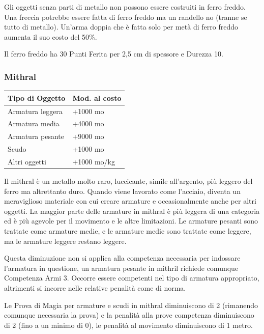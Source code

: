 \begin{multicols}{2}
Gli oggetti senza parti di metallo non possono essere costruiti in ferro freddo. Una freccia potrebbe essere fatta di ferro freddo ma un randello no (tranne se tutto di metallo). Un'arma doppia che è fatta solo per metà di ferro freddo aumenta il suo costo del 50\%.

Il ferro freddo ha 30 Punti Ferita per 2,5 cm di spessore e Durezza 10.

\subsubsection{Mithral}

\label{mithral}

\noindent\begin{tabularx}{\linewidth}{Xl}
	\toprule
\rowcolor{gray!20}\textbf{Tipo di Oggetto} & \textbf{Mod. al costo}\\
\toprule
Armatura leggera & +1000 mo\\
\rowcolor{gray!20}Armatura media & +4000 mo\\
Armatura pesante & +9000 mo\\
\rowcolor{gray!20}Scudo & +1000 mo\\
Altri oggetti & +1000 mo/kg
\end{tabularx}

\medskip

Il mithral è un metallo molto raro, luccicante, simile all'argento, più leggero del ferro ma altrettanto duro. Quando viene lavorato come l'acciaio, diventa un meraviglioso materiale con cui creare armature e occasionalmente anche per altri oggetti. La maggior parte delle armature in mithral è più leggera di una categoria ed è più agevole per il movimento e le altre limitazioni. Le armature pesanti sono trattate come armature medie, e le armature medie sono trattate come leggere, ma le armature leggere restano leggere.

Questa diminuzione non si applica alla competenza necessaria per indossare l'armatura in questione, un armatura pesante in mithril richiede comunque Competenza Armi 3. Occorre essere competenti nel tipo di armatura appropriato, altrimenti si incorre nelle relative penalità come di norma.

Le Prova di Magia per armature e scudi in mithral diminuiscono di 2 (rimanendo comunque necessaria la prova) e la penalità alla prove competenza diminuiscono di 2 (fino a un minimo di 0), le penalità al movimento diminuiscono di 1 metro.


\end{multicols}
